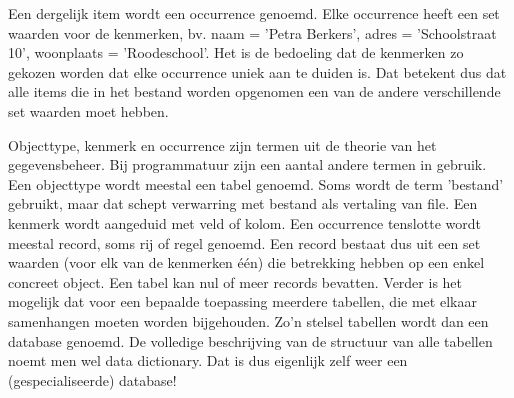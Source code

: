 Een dergelijk item wordt een occurrence genoemd. Elke occurrence heeft een set waarden voor de kenmerken, bv. naam = 'Petra Berkers', adres = 'Schoolstraat 10', woonplaats = 'Roodeschool'. Het is de bedoeling dat de kenmerken zo gekozen worden dat elke occurrence uniek aan te duiden is. Dat betekent dus dat alle items die in het bestand worden opgenomen een van de andere verschillende set waarden moet hebben.

Objecttype, kenmerk en occurrence zijn termen uit de theorie van het gegevensbeheer. Bij programmatuur zijn een aantal andere termen in gebruik. Een objecttype wordt meestal een tabel genoemd. Soms wordt de term 'bestand' gebruikt, maar dat schept verwarring met bestand als vertaling van file. Een kenmerk wordt aangeduid met veld of kolom. Een occurrence tenslotte wordt meestal record, soms rij of regel genoemd. Een record bestaat dus uit een set waarden (voor elk van de kenmerken één) die betrekking hebben op een enkel concreet object. Een tabel kan nul of meer records bevatten. Verder is het mogelijk dat voor een bepaalde toepassing meerdere tabellen, die met elkaar samenhangen moeten worden bijgehouden. Zo'n stelsel tabellen wordt dan een database genoemd. De volledige beschrijving van de structuur van alle tabellen noemt men wel data dictionary. Dat is dus eigenlijk zelf weer een (gespecialiseerde) database!


